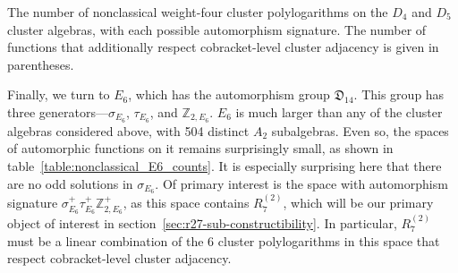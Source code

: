 \documentclass[12pt]{article}
\begin{document}
\begin{table}
\caption{The number of nonclassical weight-four cluster polylogarithms on the $D_4$ and $D_5$ cluster algebras, with each possible automorphism signature. The number of functions that additionally respect cobracket-level cluster adjacency is given in parentheses.}
\label{table:nonclassical_Dn_counts}
\end{table}


Finally, we turn to $E_6$, which has the automorphism group ${\mathfrak D}_{14}$. This group has three generators---$\sigma_{E_6}$, $\tau_{E_6}$, and $\mathbb{Z}_{2,E_6}$. $E_6$ is much larger than any of the cluster algebras considered above, with 504 distinct $A_2$ subalgebras. Even so, the spaces of automorphic functions on it remains surprisingly small, as shown in table~\ref{table:nonclassical_E6_counts}. It is especially surprising here that there are no odd solutions in $\sigma_{E_6}$. Of primary interest is the space with automorphism signature $\sigma_{E_6}^+ \tau_{E_6}^+ \mathbb{Z}_{2,E_6}^+$, as this space contains $R^{(2)}_7$, which will be our primary object of interest in section~\ref{sec:r27-sub-constructibility}. In particular, $R^{(2)}_7$ must be a linear combination of the 6 cluster polylogarithms in this space that respect cobracket-level cluster adjacency.
\end{document}
